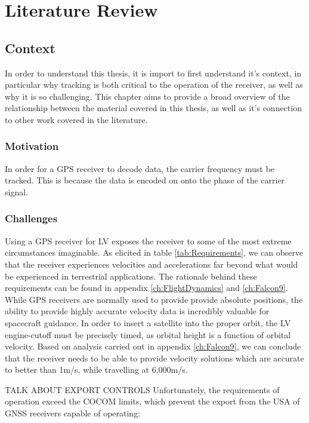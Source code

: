 \chapter{Literature Review}\label{ch:LitReview}

\section{Context}
In order to understand this thesis, it is import to first understand it's context, in particular why tracking is both critical to the operation of the receiver, as well as why it is so challenging. This chapter aims to provide a broad overview of the relationship between the material covered in this thesis, as well as it's connection to other work covered in the literature. 

\subsection{Motivation}
In order for a \ac{GPS} receiver to decode data, the carrier frequency must be tracked. This is because the data is encoded on onto the phase of the carrier signal. 

\subsection{Challenges}
Using a GPS receiver for \ac{LV} exposes the receiver to some of the most extreme circumstances imaginable. As elicited in table \ref{tab:Requirements}, we can observe that the receiver experiences velocities and accelerations far beyond what would be experienced in terrestrial applications.  The rationale behind these requirements can be found in appendix \ref{ch:FlightDynamics} and \ref{ch:Falcon9}. 
While \ac{GPS} receivers are normally used to provide provide absolute positions, the ability to provide highly accurate velocity data is incredibly valuable for spacecraft guidance. In order to insert a satellite into the proper orbit, the \ac{LV} engine-cutoff must be precisely timed, as orbital height is a function of orbital velocity. Based on analysis carried out in appendix \ref{ch:Falcon9}, we can conclude that the receiver needs to be able to provide velocity solutions which are accurate to better than 1m/s, while travelling at 6,000m/s. 



TALK ABOUT EXPORT CONTROLS
Unfortunately, the requirements of operation exceed the \ac{COCOM} limits, which prevent the export from the USA of GNSS receivers capable of operating:

